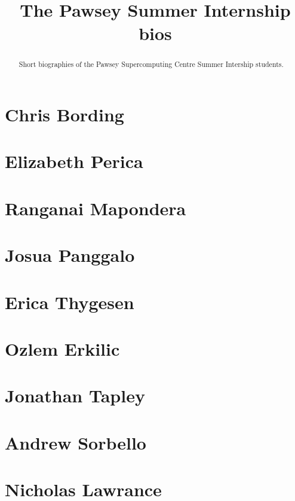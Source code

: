 \documentclass[11pt,a4paper]{report}
\title{The Pawsey Summer Internship bios}
\begin{document}
\maketitle
\tableofcontents


\begin{abstract}

Short biographies of the Pawsey Supercomputing Centre Summer Intership students.

\end{abstract}

\chapter{Chris Bording}




\chapter{Elizabeth Perica}




\chapter{Ranganai Mapondera}


\chapter{Josua Panggalo}



\chapter{Erica Thygesen}



\chapter{Ozlem Erkilic}


\chapter{Jonathan Tapley}

\chapter{Andrew Sorbello}

\chapter{Nicholas Lawrance}

\end{document}
